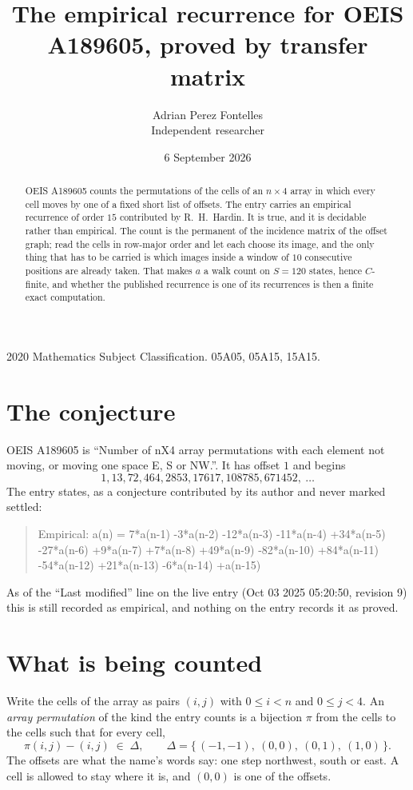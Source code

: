 \documentclass[11pt,a4paper]{article}
\title{The empirical recurrence for OEIS A189605, proved by transfer matrix}
\author{Adrian Perez Fontelles\\ \small Independent researcher}
\date{6 September 2026}
\theoremstyle{plain}
\theoremstyle{definition}
\begin{document}
\maketitle

\begin{abstract}
OEIS A189605 counts the permutations of the cells of an $n\times4$ array in which every cell
moves by one of a fixed short list of offsets. The entry carries an empirical recurrence of
order $15$ contributed by R.~H.~Hardin. It is true, and it is decidable rather than
empirical. The count is the permanent of the incidence matrix of the offset graph; read the
cells in row-major order and let each choose its image, and the only thing that has to be
carried is which images inside a window of $10$ consecutive positions are already taken.
That makes $a$ a walk count on $S=120$ states, hence $C$-finite, and whether the published
recurrence is one of its recurrences is then a finite exact computation.
\end{abstract}

\noindent\small 2020 Mathematics Subject Classification. 05A05, 05A15, 15A15.\normalsize

\section{The conjecture}

OEIS A189605 is ``Number of nX4 array permutations with each element not moving, or moving one space E, S or NW.''. It has offset $1$ and begins
\[
1, 13, 72, 464, 2853, 17617, 108785, 671452,\ \dots
\]
The entry states, as a conjecture contributed by its author and never marked settled:
\begin{quote}
Empirical: a(n) = 7*a(n-1) -3*a(n-2) -12*a(n-3) -11*a(n-4) +34*a(n-5) -27*a(n-6) +9*a(n-7) +7*a(n-8) +49*a(n-9) -82*a(n-10) +84*a(n-11) -54*a(n-12) +21*a(n-13) -6*a(n-14) +a(n-15)
\end{quote}
As of the ``Last modified'' line on the live entry (Oct 03 2025 05:20:50, revision 9) this is still
recorded as empirical, and nothing on the entry records it as proved.

\section{What is being counted}

Write the cells of the array as pairs $(i,j)$ with $0\le i<n$ and $0\le j<4$. An
\emph{array permutation} of the kind the entry counts is a bijection $\pi$ from the cells to
the cells such that for every cell,
\[
\pi(i,j)-(i,j)\;\in\;\Delta,\qquad
\Delta=\{\,(-1,-1),\ (0,0),\ (0,1),\ (1,0)\,\}.
\]
The offsets are what the name's words say: one step northwest, south or east. A cell is allowed to stay where it is, and $(0,0)$ is one of the offsets.
\end{document}
